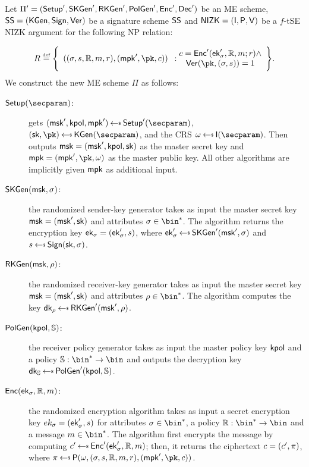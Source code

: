 \begin{construction}\label{constr:me_nizk}
    Let $\Pi'=(\mathsf{Setup}',\mathsf{SKGen}',\mathsf{RKGen}', \mathsf{PolGen}', \mathsf{Enc}',\mathsf{Dec}')$ be an ME scheme, $\mathsf{SS} =(\mathsf{KGen},\mathsf{Sign},\mathsf{Ver})$ be a signature scheme $\mathsf{SS}$ and $\mathsf{NIZK}=(\mathsf{I},\mathsf{P},\mathsf{V})$ be a $f$-tSE NIZK argument for the following NP relation:

    \[
        R \eqdef \Biggl\{ \begin{array}{c}((\sattr, \signature, \raccess, \msg, r),(\mpk', \pk, \cipher))\end{array}:\begin{array}{@{}c}
            \cipher = \enc'(\ek'_\sattr, \raccess, \msg; r) \land \\
            \ver(\pk, (\sattr, \signature)) = 1
        \end{array} \Biggr\}.
    \]
    \newline\newline
    We construct the new ME scheme $\Pi$ as follows:
    \begin{description}
        \item[$\setup(\secparam)$:] gets $(\msk', \kpol, \mpk') \getsr \setup'(\secparam)$, $(\sk, \pk) \getsr \kgen(\secparam)$, and the CRS $\crs \getsr \init(\secparam)$. Then outputs $\mathsf{msk} = (\mathsf{msk}', \mathsf{kpol}, \mathsf{sk})$ as the master secret key and $\mpk = (\mpk', \pk, \crs)$ as the master public key. All other algorithms are implicitly given $\mathsf{mpk}$ as additional input.
        \item[$\mathsf{SKGen}(\mathsf{msk}, \sigma)$:] the randomized sender-key generator takes as input the master secret key $\mathsf{msk} = (\mathsf{msk}', \mathsf{sk})$ and attributes $\sattr \in \bin^*$. The algorithm returns the encryption key $\mathsf{ek}_\sigma = (\mathsf{ek}'_\sigma, s)$, where $\ek'_\sattr \getsr \skgen'(\msk', \sattr)$ and $\signature \getsr \sign(\sk, \sattr)$.
        \item[$\mathsf{RKGen}(\mathsf{msk}, \rho)$:] the randomized receiver-key generator takes as input the master secret key $\mathsf{msk} = (\mathsf{msk}', \mathsf{sk})$ and attributes $\rattr \in \bin^*$. The algorithm computes the key $\dk_\rattr \getsr \rkgen'(\msk', \rattr)$.
        \item[$\mathsf{PolGen}(\mathsf{kpol}, \mathbb{S})$:] the receiver policy generator takes as input the master policy key $\mathsf{kpol}$ and a policy $\saccess: \bin^* \to \bin$ and outputs the decryption key $\dk_\saccess \getsr \polgen'(\kpol, \saccess)$.
        \item[$\mathsf{Enc}(\mathsf{ek}_\sigma, \mathbb{R}, m)$:] the randomized encryption algorithm takes as input a secret encryption key $ek_\sigma = (\mathsf{ek}'_\sigma, s)$ for attributes $\sattr \in \bin^*$, a policy $\raccess: \bin^* \to \bin$ and a message $\msg \in \bin^*$. The algorithm first encrypts the message by computing $\cipher' \getsr \enc'(\ek'_\sattr, \raccess, \msg)$; then, it returns the ciphertext $c = (c', \pi)$, where $\pi \getsr \prover(\crs, (\sattr, \signature, \raccess, \msg, r),(\mpk', \pk, \cipher))$.

\end{description}
\end{construction}
